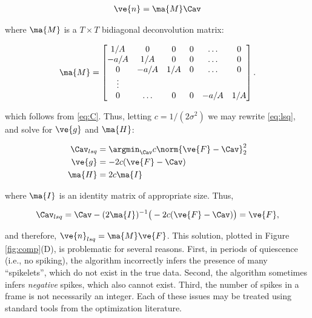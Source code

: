 \begin{align} \label{eq:nMC}
\ve{n}=\ma{M}\Cav
\end{align}

\noindent where $\ma{M}$ is a $T \times T$ bidiagonal deconvolution matrix:

\begin{equation} \label{eq:M}
\ma{M}=\begin{bmatrix}
1/A&0&0&0&\ldots&0\\
-a/A&1/A&0&0&\ldots&0\\
0&-a/A&1/A&0&\ldots&0\\
\vdots\\
0&\ldots&0&0&-a/A&1/A
\end{bmatrix}.
\end{equation}

\noindent which follows from \eqref{eq:C}. Thus, letting $c=1/(2\sigma^2)$ we may rewrite \eqref{eq:lsq}, and solve for $\ve{g}$ and $\ma{H}$:

\begin{align}
\Cav_{lsq} &= \argmin_{\Cav} c\norm{\ve{F}-\Cav}_2^2\\
\ve{g} &= -2c(\ve{F}-\Cav)\\
\ma{H}&= 2c\ma{I}
\end{align}

\noindent where $\ma{I}$ is an identity matrix of appropriate size.  Thus,

\begin{align}
\Cav_{lsq} = \Cav-(2\ma{I})^{-1} \big(-2c(\ve{F}-\Cav)\big)=\ve{F},
\end{align}

\noindent and therefore, $\ve{n}_{lsq}=\ma{M}\ve{F}$.
This solution, plotted in Figure \ref{fig:comp}(D), is problematic for several reasons. First, in periods of quiescence (i.e., no spiking), the algorithm incorrectly infers the presence of many ``spikelets'', which do not exist in the true data.  Second, the algorithm sometimes infers \emph{negative} spikes, which also cannot exist. Third, the number of spikes in a frame is not necessarily an integer.  Each of these issues may be treated using standard tools from the optimization literature.

